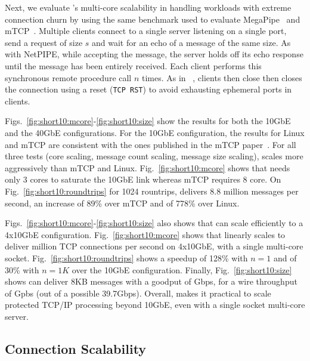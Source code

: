 Next, we evaluate \ix's multi-core scalability in handling workloads
with extreme connection churn by using the same benchmark used to
evaluate MegaPipe~\cite{DBLP:conf/osdi/HanMCR12} and
mTCP~\cite{jeong2014mtcp}. Multiple clients connect to a single server
listening on a single port, send a request of size $s$ and wait for an
echo of a message of the same size.  As with NetPIPE, while accepting
the message, the server holds off its echo response until the message
has been entirely received.  Each client performs this synchronous
remote procedure call $n$ times. As in ~\cite{jeong2014mtcp}, clients then close 
then closes the connection using a
reset (\texttt{TCP RST}) to avoid exhausting ephemeral ports in clients.



Figs.~\ref{fig:short10:mcore}-\ref{fig:short10:size} show the results
for both the 10GbE and the 40GbE configurations.  
For the 10GbE configuration, the results for Linux and mTCP are consistent with the ones
published in the mTCP paper~\cite{jeong2014mtcp}.  For all three tests
(core scaling, message count scaling, message size scaling), \ix
scales more aggressively than mTCP and
Linux. Fig.~\ref{fig:short10:mcore} shows that \ix needs only 3 cores
to saturate the 10GbE link whereas mTCP requires 8 core. On
Fig.~\ref{fig:short10:roundtrips} for 1024 rountrips, \ix delivers 8.8
million messages per second, an increase of 89\% over mTCP and of 778\%
over Linux.

Figs.~\ref{fig:short10:mcore}-\ref{fig:short10:size} also shows that
\ix can scale efficiently to a 4x10GbE configuration.
Fig.~\ref{fig:short10:mcore} shows that \ix linearly scales to deliver
million TCP connections per second on 4x10GbE, with a single multi-core socket.
Fig.~\ref{fig:short10:roundtrips} shows a speedup of 128\% with $n=1$
and of 30\% with $n=1K$ over the 10GbE configuration.  Finally,
Fig.~\ref{fig:short10:size} shows \ix can deliver 8KB messages with a
goodput of Gbps, for a wire throughput of Gpbs (out of
a possible 39.7Gbps).  Overall, \ix makes it practical to scale
protected TCP/IP processing beyond 10GbE, even with a single socket
multi-core server.


\subsection{Connection Scalability}

